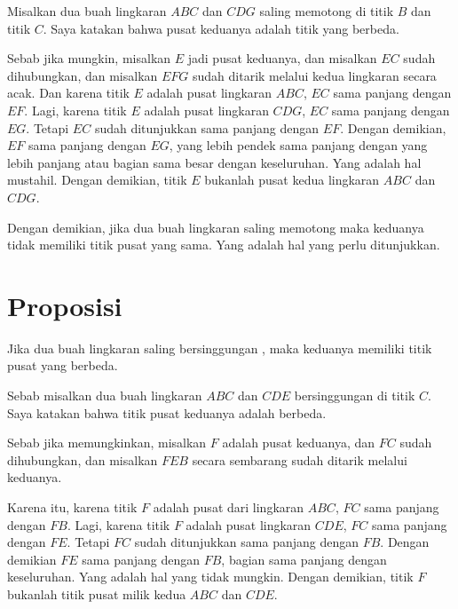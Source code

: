 \documentclass[a4paper]{book}
\begin{document}
Misalkan dua buah lingkaran $ABC$ dan $CDG$ saling memotong di titik $B$ dan 
titik $C$. Saya katakan bahwa pusat keduanya adalah titik yang berbeda.

Sebab jika mungkin, misalkan $E$ jadi pusat keduanya, dan misalkan $EC$ sudah 
dihubungkan, dan misalkan $EFG$ sudah ditarik melalui kedua lingkaran secara
acak. Dan karena titik $E$ adalah pusat lingkaran $ABC$, $EC$ sama panjang 
dengan $EF$. Lagi, karena titik $E$ adalah pusat lingkaran $CDG$, $EC$ sama
panjang dengan $EG$. Tetapi $EC$ sudah ditunjukkan sama panjang dengan $EF$.
Dengan demikian, $EF$ sama panjang dengan $EG$, yang lebih pendek sama panjang
dengan yang lebih panjang atau bagian sama besar dengan keseluruhan. 
Yang adalah hal mustahil. Dengan demikian, titik $E$
bukanlah pusat kedua lingkaran $ABC$ dan $CDG$.

Dengan demikian, jika dua buah lingkaran saling memotong maka keduanya tidak
memiliki titik pusat yang sama. Yang adalah hal yang perlu ditunjukkan.

\section*{\centering Proposisi \thesection}
Jika dua buah lingkaran saling bersinggungan , maka keduanya memiliki titik 
pusat yang berbeda.
\begin{center}
\end{center}
Sebab misalkan dua buah lingkaran $ABC$ dan $CDE$ bersinggungan di titik $C$.
Saya katakan bahwa titik pusat keduanya adalah berbeda.

Sebab jika memungkinkan, misalkan $F$ adalah pusat keduanya, dan $FC$ sudah 
dihubungkan, dan misalkan $FEB$  secara sembarang sudah ditarik melalui 
keduanya.

Karena itu, karena titik $F$ adalah pusat dari lingkaran $ABC$, $FC$ sama 
panjang dengan $FB$. Lagi, karena titik $F$ adalah pusat lingkaran $CDE$, $FC$
sama panjang dengan $FE$. Tetapi $FC$ sudah ditunjukkan sama panjang dengan
$FB$. Dengan demikian $FE$ sama panjang dengan $FB$, bagian sama panjang dengan
keseluruhan. Yang adalah hal yang tidak mungkin. Dengan demikian, titik $F$
bukanlah titik pusat milik kedua $ABC$ dan $CDE$.
\end{document}
